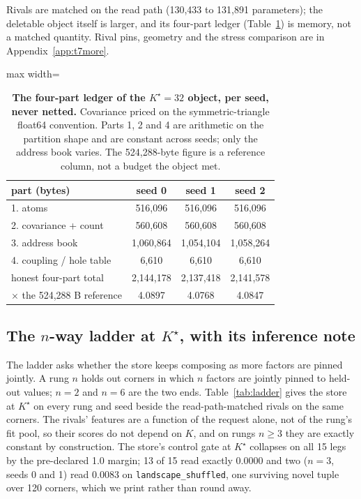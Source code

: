 \documentclass{article} %
\newcommand{\Kstar}{\ensuremath{K^{\star}}}
\begin{document}
\noindent Rivals are matched on the read path (130,433 to 131,891 parameters); the deletable object
itself is larger, and its four-part ledger (Table~\ref{tab:ledger-kstar}) is memory, not a matched
quantity. Rival pins, geometry and the stress comparison are in Appendix~\ref{app:t7more}.

\begin{table}[t]
\centering\small
\caption{\textbf{The four-part ledger of the $\Kstar=32$ object, per seed, never netted.}
Covariance priced on the symmetric-triangle float64 convention. Parts 1, 2 and 4 are
arithmetic on the partition shape and are constant across seeds; only the address book varies.
The 524,288-byte figure is a reference column, not a budget the object met.}
\label{tab:ledger-kstar}
\begin{adjustbox}{max width=\linewidth}\begin{tabular}{lccc}
\toprule
part (bytes) & seed 0 & seed 1 & seed 2 \\
\midrule
1. atoms & 516,096 & 516,096 & 516,096 \\
2. covariance + count & 560,608 & 560,608 & 560,608 \\
3. address book & 1,060,864 & 1,054,104 & 1,058,264 \\
4. coupling / hole table & 6,610 & 6,610 & 6,610 \\
honest four-part total & 2,144,178 & 2,137,418 & 2,141,578 \\
$\times$ the 524,288 B reference & 4.0897 & 4.0768 & 4.0847 \\ %
\bottomrule
\end{tabular}\end{adjustbox}
\end{table}

\subsection{The $n$-way ladder at $\Kstar$, with its inference note}
\label{sec:ladder}

The ladder asks whether the store keeps composing as more factors are pinned jointly. A rung
$n$ holds out corners in which $n$ factors are jointly pinned to held-out values; $n=2$ and
$n=6$ are the two ends. Table~\ref{tab:ladder} gives the store at $\Kstar$ on every rung and
seed beside the read-path-matched rivals on the same corners. The rivals' features are a
function of the request alone, not of the rung's fit pool, so their scores do not depend on
$K$, and on rungs $n\ge3$ they are exactly constant by construction.
The store's control gate at $\Kstar$ collapses on all 15 legs by the pre-declared 1.0 margin;
13 of 15 read exactly 0.0000 and two ($n=3$, seeds 0 and 1) read 0.0083 on
\texttt{landscape\_shuffled}, one surviving novel tuple over 120 corners, which we print
rather than round away. %
\end{document}
